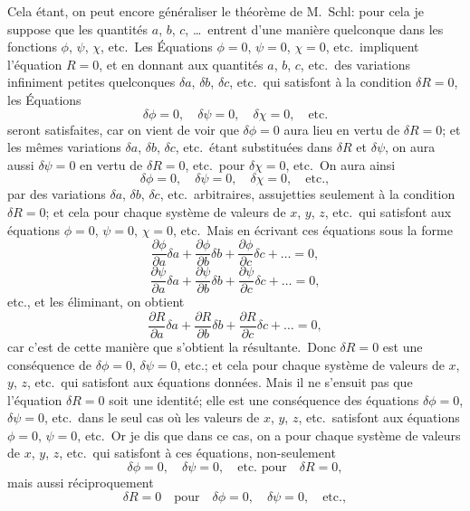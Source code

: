 \documentclass[11pt,a4paper]{book}
\begin{document}
Cela \'{e}tant, on peut encore g\'{e}n\'{e}raliser le th\'{e}or\`{e}me de M.~Schl\afli: pour cela je suppose que les quantit\'{e}s $a$, $b$, $c$, \ldots\ entrent d'une mani\`{e}re quelconque dans les fonctions $\phi$, $\psi$, $\chi$, etc.\ Les \'{E}quations $\phi=0$, $\psi=0$, $\chi=0$, etc.\ impliquent l'\'{e}quation $R=0$, et en donnant aux quantit\'{e}s $a$, $b$, $c$, etc.\ des variations infiniment petites quelconques $\delta a$, $\delta b$, $\delta c$, etc.\ qui satisfont \`{a} la condition $\delta R=0$, les \'{E}quations
\[
\delta\phi=0,\quad \delta\psi=0,\quad \delta\chi=0,\quad \text{etc.}
\]
seront satisfaites, car on vient de voir que $\delta\phi=0$ aura lieu en vertu de $\delta R=0$; et les m\^{e}mes variations $\delta a$, $\delta b$, $\delta c$, etc.\ \'{e}tant substitu\'{e}es dans $\delta R$ et $\delta\psi$, on aura aussi $\delta\psi=0$ en vertu de $\delta R=0$, etc.\ pour $\delta\chi=0$, etc.\ On aura ainsi
\[
\delta\phi=0,\quad \delta\psi=0,\quad \delta\chi=0,\quad \text{etc.},
\]
par des variations $\delta a$, $\delta b$, $\delta c$, etc.\ arbitraires, assujetties seulement \`{a} la condition $\delta R=0$; et cela pour chaque syst\`{e}me de valeurs de $x$, $y$, $z$, etc.\ qui satisfont aux \'{e}quations $\phi=0$, $\psi=0$, $\chi=0$, etc.\ Mais en \'{e}crivant ces \'{e}quations sous la forme
\[
\frac{\partial\phi}{\partial a}\delta a+\frac{\partial\phi}{\partial b}\delta b+\frac{\partial\phi}{\partial c}\delta c+\ldots=0,
\]
\[
\frac{\partial\psi}{\partial a}\delta a+\frac{\partial\psi}{\partial b}\delta b+\frac{\partial\psi}{\partial c}\delta c+\ldots=0,
\]
etc.,
et les \'{e}liminant, on obtient
\[
\frac{\partial R}{\partial a}\delta a+\frac{\partial R}{\partial b}\delta b+\frac{\partial R}{\partial c}\delta c+\ldots=0,
\]
car c'est de cette mani\`{e}re que s'obtient la r\'{e}sultante.\ Donc $\delta R=0$ est une cons\'{e}quence de $\delta\phi=0$, $\delta\psi=0$, etc.; et cela pour chaque syst\`{e}me de valeurs de $x$, $y$, $z$, etc.\ qui satisfont aux \'{e}quations donn\'{e}es. Mais il ne s'ensuit pas que l'\'{e}quation $\delta R=0$ soit une identit\'{e}; elle est une cons\'{e}quence des \'{e}quations $\delta\phi=0$, $\delta\psi=0$, etc.\ dans le seul cas o\`{u} les valeurs de $x$, $y$, $z$, etc.\ satisfont aux \'{e}quations $\phi=0$, $\psi=0$, etc.\ Or je dis que dans ce cas, on a pour chaque syst\`{e}me de valeurs de $x$, $y$, $z$, etc.\ qui satisfont \`{a} ces \'{e}quations, non-seulement
\[
\delta\phi=0,\quad \delta\psi=0,\quad \text{etc.\ pour}\quad \delta R=0,
\]
mais aussi r\'{e}ciproquement
\[
\delta R=0\quad \text{pour}\quad \delta\phi=0,\quad \delta\psi=0,\quad \text{etc.},
\]
\end{document}
